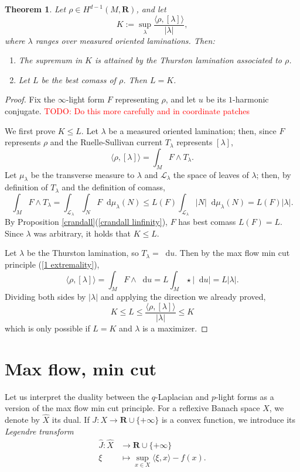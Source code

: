 \documentclass[reqno,11pt]{amsart}
\newcommand{\RR}{\mathbf{R}}
\newcommand*\dif{\mathop{}\!\mathrm{d}}
\newcommand{\dfn}[1]{\emph{#1}\index{#1}}
\newtheorem{theorem}{Theorem}[section]
\theoremstyle{definition}
\numberwithin{equation}{section}
\newcommand\todo[1]{\textcolor{red}{TODO: #1}}
\begin{document}
\begin{theorem}\label{L equals K}
	Let $\rho \in H^{d - 1}(M, \RR)$, and let 
	$$K := \sup_\lambda \frac{\langle \rho, [\lambda]\rangle}{|\lambda|},$$
	where $\lambda$ ranges over measured oriented laminations. Then:
\begin{enumerate}
	\item The supremum in $K$ is attained by the Thurston lamination associated to $\rho$.
	\item Let $L$ be the best comass of $\rho$. Then $L = K$.
\end{enumerate}
\end{theorem}
\begin{proof}
Fix the $\infty$-light form $F$ representing $\rho$, and let $u$ be its $1$-harmonic conjugate. \todo{Do this more carefully and in coordinate patches}

We first prove $K \leq L$.
Let $\lambda$ be a measured oriented lamination; then, since $F$ represents $\rho$ and the Ruelle-Sullivan current $T_\lambda$ represents $[\lambda]$,
$$\langle \rho, [\lambda]\rangle = \int_M F \wedge T_\lambda.$$
Let $\mu_\lambda$ be the transverse measure to $\lambda$ and $\mathscr L_\lambda$ the space of leaves of $\lambda$; then, by definition of $T_\lambda$ and the definition of comass,
$$\int_M F \wedge T_\lambda = \int_{\mathscr L_\lambda} \int_N F \dif \mu_\lambda(N) \leq L(F) \int_{\mathscr L_\lambda} |N| \dif \mu_\lambda(N) = L(F) |\lambda|.$$
By Proposition \ref{crandall}(\ref{crandall linfinity}), $F$ has best comass $L(F) = L$.
Since $\lambda$ was arbitrary, it holds that $K \leq L$.

Let $\lambda$ be the Thurston lamination, so $T_\lambda = \dif u$.
Then by the max flow min cut principle (\ref{1 extremality}),
$$\langle \rho, [\lambda]\rangle = \int_M F \wedge \dif u = L \int_M \star |\dif u| = L|\lambda|.$$
Dividing both sides by $|\lambda|$ and applying the direction we already proved,
$$K \leq L \leq \frac{\langle \rho, [\lambda]\rangle}{|\lambda|} \leq K$$
which is only possible if $L = K$ and $\lambda$ is a maximizer.
\end{proof}

\appendix 
\section{Max flow, min cut}\label{Max Flow Min Cut}
Let us interpret the duality between the $q$-Laplacian and $p$-light forms as a version of the max flow min cut principle. 
For a reflexive Banach space $X$, we denote by $\hat X$ its dual.
If $J: X \to \RR \cup \{+\infty\}$ is a convex function, we introduce its \dfn{Legendre transform}
\begin{align*}
	\hat J: \hat X &\to \RR \cup \{+\infty\}\\
	\xi &\mapsto \sup_{x \in X} \langle \xi, x\rangle - f(x).
\end{align*}
\end{document}
